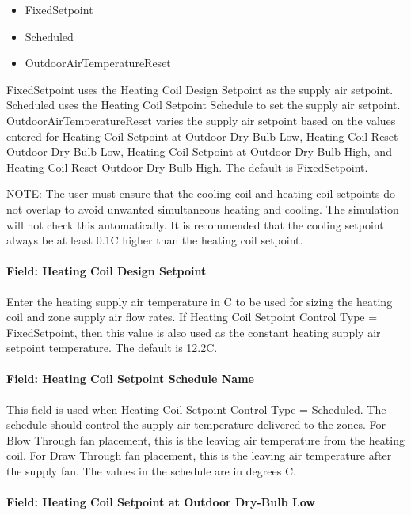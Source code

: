 \begin{itemize}
\item
  FixedSetpoint
\item
  Scheduled
\item
  OutdoorAirTemperatureReset
\end{itemize}

FixedSetpoint uses the Heating Coil Design Setpoint as the supply air setpoint. Scheduled uses the Heating Coil Setpoint Schedule to set the supply air setpoint. OutdoorAirTemperatureReset varies the supply air setpoint based on the values entered for Heating Coil Setpoint at Outdoor Dry-Bulb Low, Heating Coil Reset Outdoor Dry-Bulb Low, Heating Coil Setpoint at Outdoor Dry-Bulb High, and Heating Coil Reset Outdoor Dry-Bulb High. The default is FixedSetpoint.

NOTE: The user must ensure that the cooling coil and heating coil setpoints do not overlap to avoid unwanted simultaneous heating and cooling. The simulation will not check this automatically. It is recommended that the cooling setpoint always be at least 0.1C higher than the heating coil setpoint.

\paragraph{Field: Heating Coil Design Setpoint}\label{field-heating-coil-design-setpoint-5}

Enter the heating supply air temperature in C to be used for sizing the heating coil and zone supply air flow rates. If Heating Coil Setpoint Control Type = FixedSetpoint, then this value is also used as the constant heating supply air setpoint temperature. The default is 12.2C.

\paragraph{Field: Heating Coil Setpoint Schedule Name}\label{field-heating-coil-setpoint-schedule-name-4}

This field is used when Heating Coil Setpoint Control Type = Scheduled. The schedule should control the supply air temperature delivered to the zones. For Blow Through fan placement, this is the leaving air temperature from the heating coil. For Draw Through fan placement, this is the leaving air temperature after the supply fan. The values in the schedule are in degrees C.

\paragraph{Field: Heating Coil Setpoint at Outdoor Dry-Bulb Low}\label{field-heating-coil-setpoint-at-outdoor-dry-bulb-low-2}

